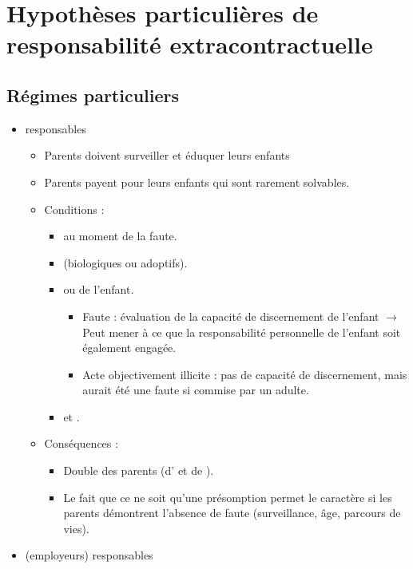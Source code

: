 \section{Hypothèses particulières de responsabilité extracontractuelle}

\subsection{Régimes particuliers}
\begin{itemize}
	\item {} responsables 
	\begin{itemize}
		\item Parents doivent surveiller et éduquer leurs enfants
		\item Parents payent pour leurs enfants qui sont rarement solvables.
		\item Conditions :
		\begin{itemize}
			\item {} au moment de la faute.
			\item {} (biologiques ou adoptifs).
			\item {} ou  de l'enfant.
			\begin{itemize}
				\item Faute : évaluation de la capacité de discernement de l'enfant $\rightarrow$ Peut mener à ce que la responsabilité personnelle de l'enfant soit également engagée.
				\item Acte objectivement illicite : pas de capacité de discernement, mais aurait été une faute si commise par un adulte.
			\end{itemize}
			\item {} et .
		\end{itemize}
	    \item Conséquences :
	    \begin{itemize}
	    	\item Double  des parents (d' et de ).
	    	\item Le fait que ce ne soit qu'une présomption permet le caractère  si les parents démontrent l'absence de faute (surveillance, âge, parcours de vies).
	    \end{itemize}
	\end{itemize}
	\item {} (employeurs) responsables 

\end{itemize}

